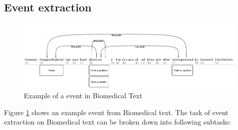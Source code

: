 \subsection{Event extraction}

\begin{figure}
\includegraphics[scale=0.4]{figures/EventExample.png}
\caption{Example of a event in Biomedical Text}\label{fig:eventExample}
\end{figure}

Figure \ref{fig:eventExample} shows an example event from Biomedical text. The task of event extraction on Biomedical text can be broken down into following subtasks:

